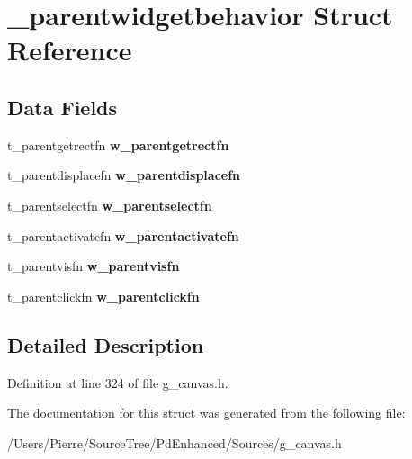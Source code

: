 \hypertarget{struct__parentwidgetbehavior}{\section{\-\_\-parentwidgetbehavior Struct Reference}
\label{struct__parentwidgetbehavior}
}
\subsection*{Data Fields}
\begin{DoxyCompactItemize}
\item 
\hypertarget{struct__parentwidgetbehavior_a10663dbd301fc025489d878211c012e6}{t\-\_\-parentgetrectfn {\bfseries w\-\_\-parentgetrectfn}}\label{struct__parentwidgetbehavior_a10663dbd301fc025489d878211c012e6}

\item 
\hypertarget{struct__parentwidgetbehavior_a8d451145e8398ffb89050a6dee98275f}{t\-\_\-parentdisplacefn {\bfseries w\-\_\-parentdisplacefn}}\label{struct__parentwidgetbehavior_a8d451145e8398ffb89050a6dee98275f}

\item 
\hypertarget{struct__parentwidgetbehavior_a583df13f75a18fca448ad13524beb1ca}{t\-\_\-parentselectfn {\bfseries w\-\_\-parentselectfn}}\label{struct__parentwidgetbehavior_a583df13f75a18fca448ad13524beb1ca}

\item 
\hypertarget{struct__parentwidgetbehavior_aeb3f20eba2f83cb674b9e1acc8d462ef}{t\-\_\-parentactivatefn {\bfseries w\-\_\-parentactivatefn}}\label{struct__parentwidgetbehavior_aeb3f20eba2f83cb674b9e1acc8d462ef}

\item 
\hypertarget{struct__parentwidgetbehavior_a1b24e882020f1a1d27b858b72ebce259}{t\-\_\-parentvisfn {\bfseries w\-\_\-parentvisfn}}\label{struct__parentwidgetbehavior_a1b24e882020f1a1d27b858b72ebce259}

\item 
\hypertarget{struct__parentwidgetbehavior_a95d19db4e3f6e98ebc2df45f85715e96}{t\-\_\-parentclickfn {\bfseries w\-\_\-parentclickfn}}\label{struct__parentwidgetbehavior_a95d19db4e3f6e98ebc2df45f85715e96}

\end{DoxyCompactItemize}


\subsection{Detailed Description}


Definition at line 324 of file g\-\_\-canvas.\-h.



The documentation for this struct was generated from the following file\-:\begin{DoxyCompactItemize}
\item 
/\-Users/\-Pierre/\-Source\-Tree/\-Pd\-Enhanced/\-Sources/g\-\_\-canvas.\-h\end{DoxyCompactItemize}
